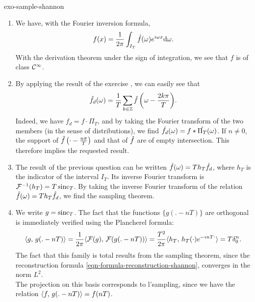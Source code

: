  
\begin{correction}{exo-sample-shannon}
\begin{enumerate}
\item We have, with the Fourier inversion formula,
\begin{equation*}
f(x) = \frac{1}{2 \pi} \int_{I_T}{\hat{f} (\omega) e^{\imath \omega x} \mathrm{d} \omega}.
\end{equation*}
With the derivation theorem under the sign of integration, we see that $ f $ is of class $ \mathcal{C}^\infty $.
\item By applying the result of the exercise , we can easily see that
\begin{equation*}
\hat{f_d} (\omega) = \frac{1}{T} \sum_{k \in \mathbb{Z}}{\hat{f} \left(\omega - \frac{2k \pi}{T} \right)}.
\end{equation*}
Indeed, we have $ f_d = f \cdot \Pi_T $, and by taking the Fourier transform of the two members (in the sense of distributions), we find $ \hat{f_d} (\omega) = f * \hat{\Pi_T} (\omega) $. If $ n \neq 0 $, the support of $ \hat{f} \left(\cdot - \frac{n \pi}{T} \right) $ and that of $ \hat{f} $ are of empty intersection. This therefore implies the requested result.
\item The result of the previous question can be written $ \hat{f} (\omega) = T h_T \hat{f_d} $, where $ h_T $ is the indicator of the interval $ I_T $. Its inverse Fourier transform is $ \mathcal{F}^{-1} (h_T) = T \operatorname{sinc}_T $. By taking the inverse Fourier transform of the relation $ \hat{f} (\omega) = T h_T \hat{f_d} $, we find the sampling theorem.
\item We write $ g = \operatorname{sinc}_T $. The fact that the functions $ \{g (.- n T)\} $ are orthogonal is immediately verified using the Plancherel formula:
\begin{equation*}
\langle g,\,g (.- n T)\rangle = \frac{1}{2 \pi} \langle \mathcal{F}(g),\,\mathcal{F}(g (.- n T))\rangle = \frac{T^2}{2 \pi} \langle h_T,\,h_T (\cdot) e^{- \imath n T \cdot}\rangle = T \delta_0^n.
\end{equation*}
The fact that this family is total results from the sampling theorem, since the reconstruction formula \eqref{eqn-formula-reconstruction-shannon}, converges in the norm $ L^2 $. \\The projection on this basis corresponds to l'sampling, since we have the relation $ \langle f,\,g (.- n T)\rangle = f(n T) $.
\end{enumerate}
\end{correction}

